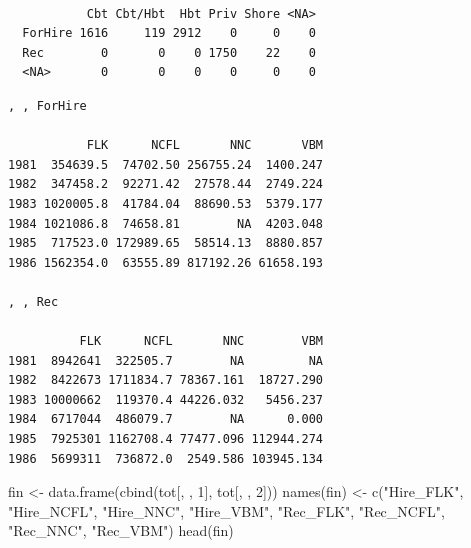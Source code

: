 \documentclass[
  letterpaper,
  oneside,
  open=any]{scrbook}
\newenvironment{Shaded}{\begin{snugshade}}{\end{snugshade}}
\newcommand{\AttributeTok}[1]{\textcolor[rgb]{0.40,0.45,0.13}{#1}}
\newcommand{\DecValTok}[1]{\textcolor[rgb]{0.68,0.00,0.00}{#1}}
\newcommand{\FunctionTok}[1]{\textcolor[rgb]{0.28,0.35,0.67}{#1}}
\newcommand{\NormalTok}[1]{\textcolor[rgb]{0.00,0.23,0.31}{#1}}
\newcommand{\OtherTok}[1]{\textcolor[rgb]{0.00,0.23,0.31}{#1}}
\newcommand{\SpecialCharTok}[1]{\textcolor[rgb]{0.37,0.37,0.37}{#1}}
\newcommand{\StringTok}[1]{\textcolor[rgb]{0.13,0.47,0.30}{#1}}
\begin{document}
\begin{verbatim}
         
           Cbt Cbt/Hbt  Hbt Priv Shore <NA>
  ForHire 1616     119 2912    0     0    0
  Rec        0       0    0 1750    22    0
  <NA>       0       0    0    0     0    0
\end{verbatim}

\begin{Shaded}
\end{Shaded}

\begin{verbatim}
, , ForHire

           FLK      NCFL       NNC       VBM
1981  354639.5  74702.50 256755.24  1400.247
1982  347458.2  92271.42  27578.44  2749.224
1983 1020005.8  41784.04  88690.53  5379.177
1984 1021086.8  74658.81        NA  4203.048
1985  717523.0 172989.65  58514.13  8880.857
1986 1562354.0  63555.89 817192.26 61658.193

, , Rec

          FLK      NCFL       NNC        VBM
1981  8942641  322505.7        NA         NA
1982  8422673 1711834.7 78367.161  18727.290
1983 10000662  119370.4 44226.032   5456.237
1984  6717044  486079.7        NA      0.000
1985  7925301 1162708.4 77477.096 112944.274
1986  5699311  736872.0  2549.586 103945.134
\end{verbatim}

\begin{Shaded}
\begin{Highlighting}[]
\NormalTok{fin }\OtherTok{\textless{}{-}} \FunctionTok{data.frame}\NormalTok{(}\FunctionTok{cbind}\NormalTok{(tot[, , }\DecValTok{1}\NormalTok{], tot[, , }\DecValTok{2}\NormalTok{]))}
\FunctionTok{names}\NormalTok{(fin) }\OtherTok{\textless{}{-}} \FunctionTok{c}\NormalTok{(}\StringTok{"Hire\_FLK"}\NormalTok{, }\StringTok{"Hire\_NCFL"}\NormalTok{, }\StringTok{"Hire\_NNC"}\NormalTok{, }\StringTok{"Hire\_VBM"}\NormalTok{, }
                \StringTok{"Rec\_FLK"}\NormalTok{, }\StringTok{"Rec\_NCFL"}\NormalTok{, }\StringTok{"Rec\_NNC"}\NormalTok{, }\StringTok{"Rec\_VBM"}\NormalTok{)}
\FunctionTok{head}\NormalTok{(fin)}
\end{Highlighting}
\end{Shaded}
\end{document}
